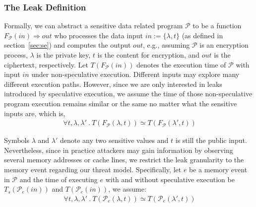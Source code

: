 \documentclass[sigconf]{acmart}
\newcommand{\prog}{\mathcal{P}}
\begin{document}
\subsubsection{The Leak Definition}

Formally, we can abstract a sensitive data related program $\prog$ to be a 
function $\mathit{F_{\prog}(in)\Rightarrow out}$ who processes the data input 
$\mathit{in}:=\{\lambda,t\}$ (as defined in section~\ref{sec:se}) and computes 
the output $\mathit{out}$, e.g., assuming $\prog$ is an encryption process,  
$\lambda$ is the private key, $t$ is the content for encryption, and $out$ is 
the ciphertext, respectively. Let $T(F_{\prog}(in))$ denotes the execution time 
of $\prog$ with input $\mathit{in}$ under non-speculative execution. Different
inputs may explore many different execution paths. However, since we are only interested 
in leaks introduced by speculative execution, we assume the time of those 
non-speculative program execution remains similar or the same no matter what 
the sensitive inputs are, which is, 
%
\begin{multline} 
  \label{lb:no_leak_event}
  ~~~~~\mathit{\forall t,\lambda,\lambda'~.~T(F_{\prog}(\lambda,t)) \simeq 
  T(F_{\prog}(\lambda',t))}~~~~
\end{multline} 
%

Symbols $\lambda$ and $\lambda'$ denote any two sensitive values and $t$ is 
still the public input. Nevertheless, since in practice attackers may gain 
information by observing several memory addresses or cache lines, we restrict 
the leak granularity to the memory event regarding our threat model. 
Specifically, let $\mathit{e}$ be a memory event in $\prog$ and the time of 
executing $\mathit{e}$ with and without speculative execution be 
$\mathit{T_{s}(\prog_e(in))}$ and $\mathit{T(\prog_e(in))}$, we assume:
%
\begin{multline} 
  \label{lb:no_leak_event}
  ~~~~~\mathit{\forall t,\lambda,\lambda'~.~T(\prog_e(\lambda,t)) \simeq 
  T(\prog_e(\lambda',t))}~~~~
\end{multline} 
%
\end{document}
